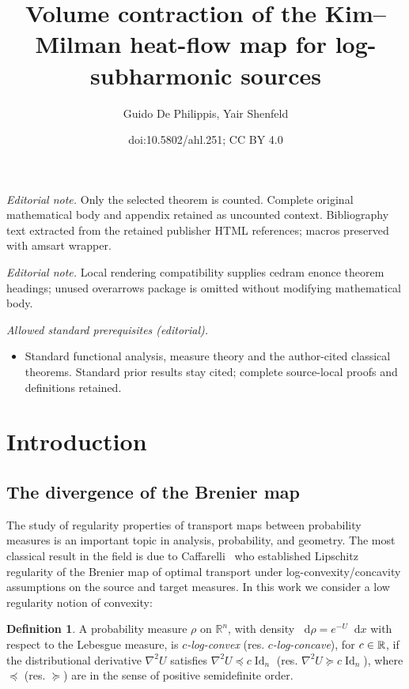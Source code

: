 \documentclass[10pt]{amsart}
\title{Volume contraction of the Kim--Milman heat-flow map for log-subharmonic sources}
\author{Guido De Philippis, Yair Shenfeld}
\date{doi:10.5802/ahl.251; CC BY 4.0}
\theoremstyle{definition}\newtheorem{defi}[theo]{Definition}\newtheorem{rema}[theo]{Remark}\newtheorem{exam}[theo]{Example}\newtheorem{exem}[theo]{Example}\newtheorem{nota}[theo]{Notation}
\newcommand{\R}{\mathbb R}
\DeclareMathOperator{\Id}{Id}
\newcommand{\dd}{n}
\newcommand{\conv}{c}
\newcommand{\prob}{\rho}
\newcommand*\diff{\mathop{}\!\mathrm{d}}
\let\oldin\in
\renewcommand{\in}{\mathchoice{\oldin}{\oldin}{\,\oldin\,}{\,\oldin\,}}
\begin{document}
\maketitle
\noindent\textit{Editorial note.} Only the selected theorem is counted. Complete original mathematical body and appendix retained as uncounted context. Bibliography text extracted from the retained publisher HTML references; macros preserved with amsart wrapper.\par\medskip
\noindent\textit{Editorial note.} Local rendering compatibility supplies cedram enonce theorem headings; unused overarrows package is omitted without modifying mathematical body.\par\medskip
\noindent\textit{Allowed standard prerequisites (editorial).}\begin{itemize}
\item Standard functional analysis, measure theory and the author-cited classical theorems. Standard prior results stay cited; complete source-local proofs and definitions retained.
\end{itemize}\medskip


\section{Introduction}



\subsection{The divergence of the Brenier map}

The study of regularity properties of transport maps between probability measures is an important topic in analysis, probability, and geometry. The most classical result in the field is due to Caffarelli~\cite{MR1800860} who established Lipschitz regularity of the Brenier map of optimal transport under log-convexity/concavity assumptions on the source and target measures. In this work we consider a low regularity notion of convexity:


\begin{defi}\label{def:log_concave}
A probability measure $\prob$ on $\R^{\dd}$, with density $\diff \prob=e^{-U}\diff x$ with respect to the Lebesgue measure, is \emph{$\conv$-log-convex} (res. \emph{$\conv$-log-concave}), for $\conv\in \R$, if the distributional derivative $\nabla^2U$ satisfies $\nabla^2U \preceq \conv \Id_{\dd}$ (res. $\nabla^2U \succeq \conv \Id_{\dd}$), where $\preceq$ (res. $\succeq$) are in the sense of positive semidefinite order.
\end{defi}
\end{document}
